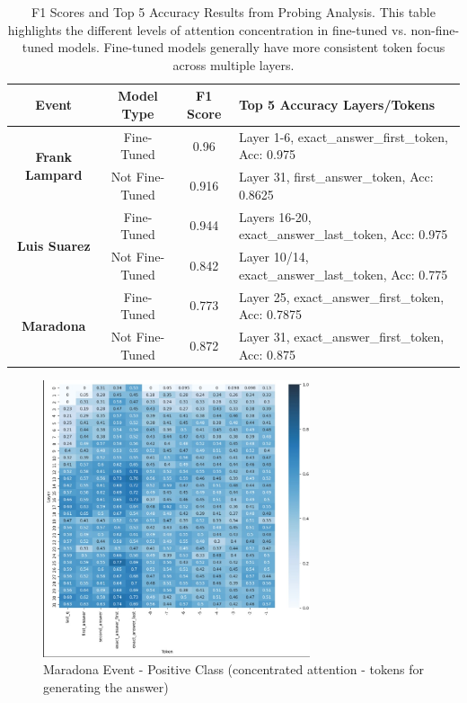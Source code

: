 \documentclass{article}
\begin{document}
\begin{table}[b]
    \centering
    \renewcommand{\arraystretch}{1.2} %
    \begin{adjustbox}{width=0.95\textwidth} %
    \begin{tabular}{|c|c|c|p{8cm}|} %
        \hline
        \textbf{Event} & \textbf{Model Type} & \textbf{F1 Score} & \textbf{Top 5 Accuracy Layers/Tokens} \\
        \hline
        \multirow{2}{*}{\textbf{Frank Lampard}} & Fine-Tuned & 0.96 & Layer 1-6, exact\_answer\_first\_token, Acc: 0.975 \\
        & Not Fine-Tuned & 0.916 & Layer 31, first\_answer\_token, Acc: 0.8625 \\
        \hline
        \multirow{2}{*}{\textbf{Luis Suarez}} & Fine-Tuned & 0.944 & Layers 16-20, exact\_answer\_last\_token, Acc: 0.975 \\
        & Not Fine-Tuned & 0.842 & Layer 10/14, exact\_answer\_last\_token, Acc: 0.775 \\
        \hline
        \multirow{2}{*}{\textbf{Maradona}} & Fine-Tuned & 0.773 & Layer 25, exact\_answer\_first\_token, Acc: 0.7875 \\
        & Not Fine-Tuned & 0.872 & Layer 31, exact\_answer\_first\_token, Acc: 0.875 \\
        \hline
    \end{tabular}
    \end{adjustbox}
    \caption{F1 Scores and Top 5 Accuracy Results from Probing Analysis. This table highlights the different levels of attention concentration in fine-tuned vs. non-fine-tuned models. Fine-tuned models generally have more consistent token focus across multiple layers.}
    \label{tab:f1_scores}
\end{table}

\clearpage


\begin{figure}[p]
    \centering
    \includegraphics[width=0.7\textwidth]{maradona-positiveclass.jpg}
    \caption{Maradona Event - Positive Class (concentrated attention - tokens for generating the answer)}
    \label{fig:maradona-positive}
\end{figure}
\end{document}

